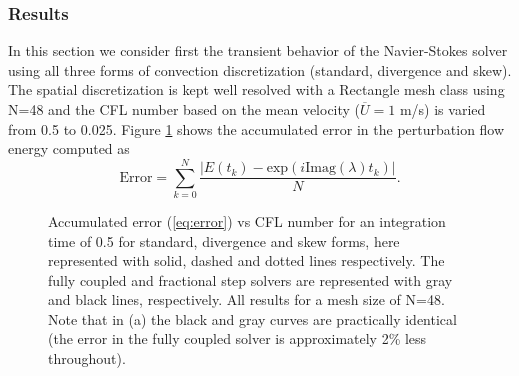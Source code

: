 \subsubsection{Results}
In this section we consider first the transient behavior of the Navier-Stokes solver using all three forms of convection discretization (standard, divergence and skew). The spatial discretization is kept well resolved with a Rectangle mesh class using N=48 and the CFL number based on the mean velocity ($\overline{U}=1$ m/s) is varied from 0.5 to 0.025. Figure \ref{fig:OS_init_cfl}  shows the accumulated error in the perturbation flow energy computed as
\begin{equation}
 \text{Error} = \sum_{k=0}^N \frac{|E(t_k)-\text{exp}(i \text{Imag}(\lambda) t_k)|}{N}.
 \label{eq:error}
\end{equation}
\begin{figure}
 \centering
 \caption{Accumulated error (\ref{eq:error}) vs CFL number for an integration time of 0.5 for standard, divergence and skew forms, here represented with solid, dashed and dotted lines respectively. The fully coupled and fractional step solvers are represented with gray and black lines, respectively. All results for a mesh size of N=48. Note that in (a) the black and gray curves are practically identical (the error in the fully coupled solver is approximately 2\% less throughout). }
\label{fig:OS_init_cfl}
\end{figure}
